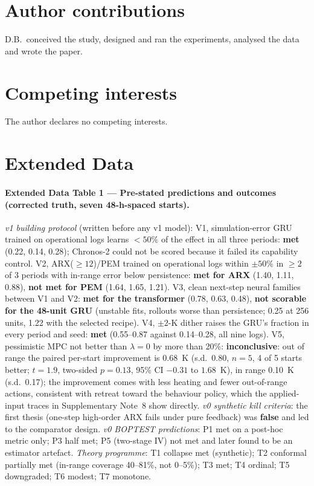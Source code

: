 \documentclass[11pt]{article}
\begin{document}
\section*{Author contributions}
D.B.\ conceived the study, designed and ran the experiments, analysed the data and wrote the paper.

\section*{Competing interests}
The author declares no competing interests.

\clearpage
\section*{Extended Data}
\paragraph{Extended Data Table 1 --- Pre-stated predictions and outcomes (corrected truth, seven 48-h-spaced starts).}
\emph{v1 building protocol} (written before any v1 model): V1, simulation-error GRU trained on operational logs learns $<50\%$ of the effect in all three periods: \textbf{met} (0.22, 0.14, 0.28); Chronos-2 could not be scored because it failed its capability control. V2, ARX($\ge12$)/PEM trained on operational logs within $\pm50\%$ in $\ge2$ of 3 periods with in-range error below persistence: \textbf{met for ARX} (1.40, 1.11, 0.88), \textbf{not met for PEM} (1.64, 1.65, 1.21). V3, clean next-step neural families between V1 and V2: \textbf{met for the transformer} (0.78, 0.63, 0.48), \textbf{not scorable for the 48-unit GRU} (unstable fits, rollouts worse than persistence; 0.25 at 256 units, 1.22 with the selected recipe). V4, $\pm2$-K dither raises the GRU's fraction in every period and seed: \textbf{met} (0.55--0.87 against 0.14--0.28, all nine logs). V5, pessimistic MPC not better than $\lambda=0$ by more than 20\%: \textbf{inconclusive}: out of range the paired per-start improvement is 0.68~K (s.d.\ 0.80, $n=5$, 4 of 5 starts better; $t=1.9$, two-sided $p=0.13$, 95\% CI $-0.31$ to $1.68$~K), in range 0.10~K (s.d.\ 0.17); the improvement comes with less heating and fewer out-of-range actions, consistent with retreat toward the behaviour policy, which the applied-input traces in Supplementary Note~8 show directly.
\emph{v0 synthetic kill criteria}: the first thesis (one-step high-order ARX fails under pure feedback) was \textbf{false} and led to the comparator design. \emph{v0 BOPTEST predictions}: P1 met on a post-hoc metric only; P3 half met; P5 (two-stage IV) not met and later found to be an estimator artefact. \emph{Theory programme}: T1 collapse met (synthetic); T2 conformal partially met (in-range coverage 40--81\%, not 0--5\%); T3 met; T4 ordinal; T5 downgraded; T6 modest; T7 monotone.
\end{document}
